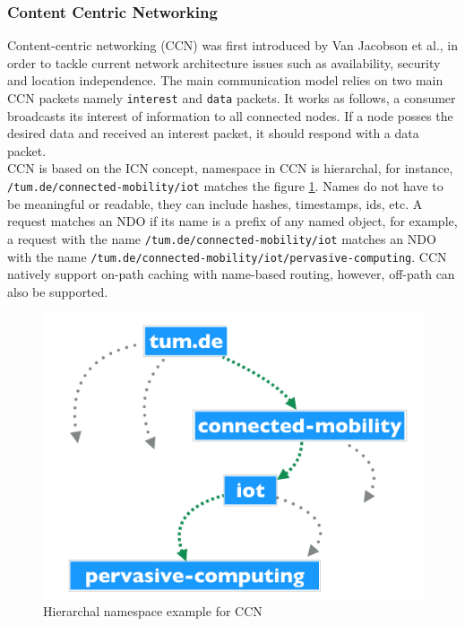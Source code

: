 \subsubsection{Content Centric Networking}
Content-centric networking (CCN) was first introduced by Van Jacobson et al., in order to tackle current network architecture issues such as availability, security and location independence. The main communication model relies on two main CCN packets namely \verb|interest| and \verb|data| packets. It works as follows, a consumer broadcasts its interest of information to all connected nodes. If a node posses the desired data and received an interest packet, it should respond with a data packet\cite{Jacobson:2009:NNC:1658939.1658941}.\\

\noindent CCN is  based on the ICN concept, namespace in CCN  is hierarchal, for instance, \verb|/tum.de/connected-mobility/iot| matches the figure \ref{fig:ccn-namespace}. Names do not have to be meaningful or readable, they can include hashes, timestamps, ids, etc. A request matches an NDO if its name is a prefix of any named object, for example,  a request with the name  \verb|/tum.de/connected-mobility/iot| matches an NDO with the name  \verb|/tum.de/connected-mobility/iot/pervasive-computing|. CCN natively support on-path caching with name-based routing, however, off-path can also be supported\cite{6563278}.
\begin{figure}[H]
	\centering
	\includegraphics[scale=0.3]{images/namespace.png}
	\caption{Hierarchal namespace example for CCN}
	\label{fig:ccn-namespace}
\end{figure}

